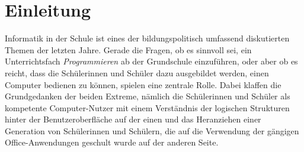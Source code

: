 \documentclass[paper=a4, pagesize, DIV=calc, BCOR=12.5mm, twoside=on, onecolumn=on, open = any, titlepage =on, parskip =half-, headsepline = on, footsepline = on, chapterprefix = on, appendixprefix = off, fontsize = 12pt, numbers = noenddot, abstract = on]{scrbook}
\numberwithin{equation}{chapter}
\theoremstyle{definition}
\theoremstyle{plain}
\theoremstyle{plain}
\theoremstyle{remark}
\theoremstyle{plain}
\theoremstyle{plain}
\begin{document}
\newpage
\thispagestyle{plain}

\newcommand*\diff{\mathop{}\!\mathrm{d}}



\thispagestyle{empty}
\cleardoublepage



\newpage
\listoffigures
\newpage
\tableofcontents
\thispagestyle{empty}
\cleardoublepage
\newpage
{}
\par \singlespacing
\chapter{Einleitung}
\onehalfspacing
Informatik in der Schule ist eines der bildungspolitisch umfassend diskutierten Themen der letzten Jahre. Gerade die Fragen, ob es sinnvoll sei, ein Unterrichtsfach \emph{Programmieren} ab der Grundschule einzuführen, oder aber ob es reicht, dass die Schülerinnen und Schüler dazu ausgebildet werden, einen Computer bedienen zu können, spielen eine zentrale Rolle. Dabei klaffen die Grundgedanken der beiden Extreme, nämlich die Schülerinnen und Schüler als kompetente Computer-Nutzer mit einem Verständnis der logischen Strukturen hinter der Benutzeroberfläche auf der einen und das Heranziehen einer Generation von Schülerinnen und Schülern, die auf die Verwendung der gängigen Office-Anwendungen geschult wurde auf der anderen Seite.\\
\end{document}
